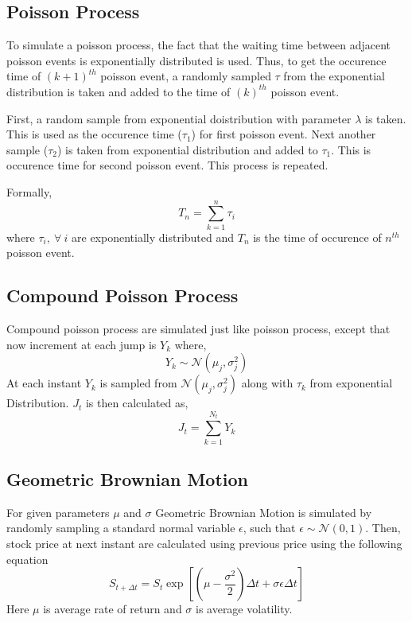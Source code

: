 \documentclass[paper.tex]{subfiles}
\begin{document}
    \subsection{Poisson Process}
        To simulate a poisson process, the fact that the waiting time between adjacent poisson events is exponentially distributed is used.
        Thus, to get the occurence time of $(k+1)^{th}$ poisson event, a randomly sampled $ \tau $ from the exponential distribution is taken and added to the time of $(k)^{th}$ poisson event. 

        First, a random sample from exponential doistribution with parameter $ \lambda $ is taken. This is used as the occurence time ($ \tau_{1} $) for first poisson event.
        Next another sample ($ \tau_{2} $) is taken from exponential distribution and added to $ \tau_{1} $.
        This is occurence time for second poisson event. This process is repeated.

        Formally, 
        \begin{equation}
            T_{n} = \sum_{k=1}^{n}\tau_{i}
            \label{eq: poisson-time}
        \end{equation}
        where $\tau_{i}, ~ \forall ~ i$ are exponentially distributed and $ T_{n} $ is the time of occurence of $ n^{th} $ poisson event.
    
    \subsection{Compound Poisson Process}
        Compound poisson process are simulated just like poisson process, except that now increment at each jump is $ Y_{k} $
        where,
        \begin{equation}
            Y_{k} \sim \mathcal{N}(\mu_{j}, \sigma_{j}^{2})
            \label{eq: compound-poisson-jump-distribution}
        \end{equation}
        At each instant $ Y_{k} $ is sampled from $ \mathcal{N}(\mu_{j}, \sigma_{j}^{2}) $ along with $ \tau_{k} $ from exponential Distribution.
        $ J_{t} $ is then calculated as,
        \begin{equation}
            J_{t} = \sum_{k=1}^{N_{t}}Y_{k}
        \end{equation}

    \subsection{Geometric Brownian Motion}
    For given parameters $ \mu $ and $ \sigma $ Geometric Brownian Motion is simulated by randomly sampling a standard normal variable $ \epsilon $, such that $ \epsilon \sim \mathcal{N}(0, 1) $.
    Then, stock price at next instant are calculated using previous price using the following equation
    \begin{equation}
        S_{t + \Delta t} = S_{t} \exp \left[ \left( \mu - \dfrac{\sigma^{2}}{2}\right) \Delta t + \sigma \epsilon \Delta t \right]
        \label{eq: gbm-simulation}
    \end{equation}
    Here $ \mu $ is average rate of return and $ \sigma $ is average volatility.
    
\end{document}
